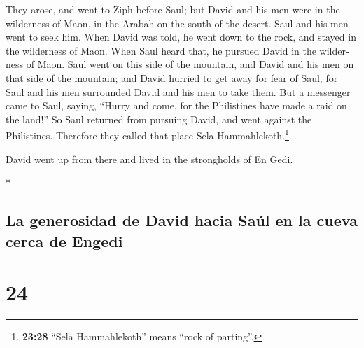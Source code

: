\begin{paracol}{2}
\begin{otherlanguage}{english}
 They arose, and went to Ziph before Saul; but David and
his men were in the wilderness of Maon, in the Arabah on the south of
the desert.  Saul and his men went to seek him. When
David was told, he went down to the rock, and stayed in the wilderness
of Maon. When Saul heard that, he pursued David in the wilderness of
Maon.  Saul went on this side of the mountain, and David
and his men on that side of the mountain; and David hurried to get away
for fear of Saul, for Saul and his men surrounded David and his men to
take them.  But a messenger came to Saul, saying, ``Hurry
and come, for the Philistines have made a raid on the land!''
 So Saul returned from pursuing David, and went against
the Philistines. Therefore they called that place Sela
Hammahlekoth.\footnote{\textbf{23:28} ``Sela Hammahlekoth'' means ``rock
  of parting''.}

 David went up from there and lived in the strongholds of
En Gedi.

\end{otherlanguage}

\switchcolumn[0]*

\hypertarget{la-generosidad-de-david-hacia-sauxfal-en-la-cueva-cerca-de-engedi}{%
\subsection{La generosidad de David hacia Saúl en la cueva cerca de
Engedi}\label{la-generosidad-de-david-hacia-sauxfal-en-la-cueva-cerca-de-engedi}}

\hypertarget{section-46}{%
\section{24}\label{section-46}}


\end{paracol}

